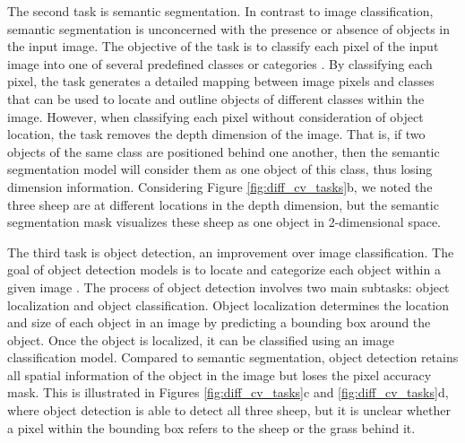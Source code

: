 The second task is semantic segmentation. In contrast to image classification, semantic segmentation is unconcerned with the presence or absence of objects in the input image. The objective of the task is to classify each pixel of the input image into one of several predefined classes or categories \cite{overview_cv_task}. By classifying each pixel, the task generates a detailed mapping between image pixels and classes that can be used to locate and outline objects of different classes within the image. However, when classifying each pixel without consideration of object location, the task removes the depth dimension of the image. That is, if two objects of the same class are positioned behind one another, then the semantic segmentation model will consider them as one object of this class, thus losing dimension information. Considering Figure \ref{fig:diff_cv_tasks}b, we noted the three sheep are at different locations in the depth dimension, but the semantic segmentation mask visualizes these sheep as one object in 2-dimensional space.

The third task is object detection, an improvement over image classification. The goal of object detection models is to locate and categorize each object within a given image \cite{overview_cv_task}. The process of object detection involves two main subtasks: object localization and object classification. Object localization determines the location and size of each object in an image by predicting a bounding box around the object. Once the object is localized, it can be classified using an image classification model. Compared to semantic segmentation, object detection retains all spatial information of the object in the image but loses the pixel accuracy mask. This is illustrated in Figures \ref{fig:diff_cv_tasks}c and \ref{fig:diff_cv_tasks}d, where object detection is able to detect all three sheep, but it is unclear whether a pixel within the bounding box refers to the sheep or the grass behind it.

